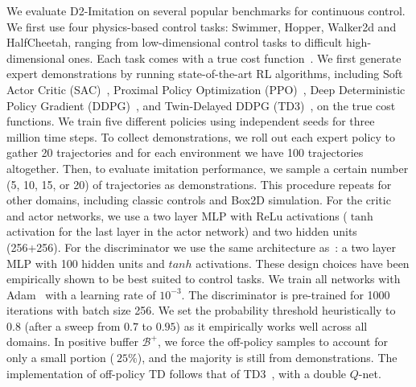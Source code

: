 \documentclass[letterpaper]{article} %
\begin{document}
We evaluate D2-Imitation on several popular benchmarks for continuous control.
We first use four physics-based control tasks: Swimmer, Hopper, Walker2d and HalfCheetah,
ranging from low-dimensional control tasks to difficult high-dimensional ones.
Each task comes with a true cost function~\cite{brockman2016openai}.
We first generate expert demonstrations by running state-of-the-art RL algorithms,
including Soft Actor Critic (SAC)~\cite{haarnoja2018soft},
Proximal Policy Optimization (PPO)~\cite{schulman2017proximal},
Deep Deterministic Policy Gradient (DDPG)~\cite{lillicrap2015continuous},
and Twin-Delayed DDPG (TD3)~\cite{fujimoto2018addressing},
on the true cost functions.
We train five different policies using independent seeds for three million time steps.
To collect demonstrations,
we roll out each expert policy to gather 20 trajectories
and for each environment we have 100 trajectories altogether.
Then, to evaluate imitation performance,
we sample a certain number (5, 10, 15, or 20) of trajectories as demonstrations.
This procedure repeats for other domains, including classic controls and Box2D simulation.
For the critic and actor networks,
we use a two layer MLP with ReLu activations ($\tanh$ activation for the last layer in the actor network) and two hidden units (256+256).
For the discriminator we use the same architecture as~\citet{ho2016generative}:
a two layer MLP with 100 hidden units and $tanh$ activations.
These design choices have been empirically shown to be best suited to control tasks.
We train all networks with Adam~\cite{kingma2014adam} with a learning rate of $10^{-3}$.
The discriminator is pre-trained for 1000 iterations with batch size 256.
We set the probability threshold heuristically to $0.8$ (after a sweep from $0.7$ to $0.95$) as it empirically works well across all domains.
In positive buffer $\mathcal{B}^+$, we force the off-policy samples to account for only a small portion ($~25\%$),
and the majority is still from demonstrations.
The implementation of off-policy TD follows that of TD3~\cite{fujimoto2018addressing}, with a double $Q$-net.
\end{document}
